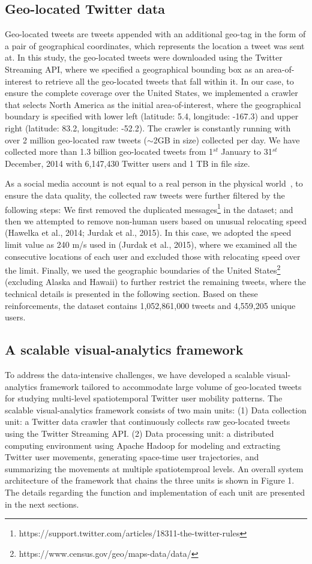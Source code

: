 \documentclass[a4paper, 11pt]{article}
\begin{document}
\subsection{Geo-located Twitter data}
Geo-located tweets are tweets appended with an additional geo-tag in the form of a pair of geographical coordinates, which represents the location a tweet was sent at. In this study, the geo-located tweets were downloaded using the Twitter Streaming API, where we specified a geographical bounding box as an area-of-interest to retrieve all the geo-located tweets that fall within it. 
In our case, to ensure the complete coverage over the United States, we implemented a crawler that selects North America as the initial area-of-interest, where the geographical boundary is specified with lower left (latitude: 5.4, longitude: -167.3) and upper right (latitude: 83.2, longitude: -52.2).
The crawler is constantly running with over 2 million geo-located raw tweets ($\sim$2GB in size) collected per day.
We have collected more than 1.3 billion geo-located tweets from 1$^{st}$ January to 31$^{st}$ December, 2014 with 6,147,430 Twitter users and 1 TB in file size.

As a social media account is not equal to a real person in the physical world~\citep{tsou2015}, to ensure the data quality, the collected raw tweets were further filtered by the following steps: We first removed the duplicated messages\footnote{https://support.twitter.com/articles/18311-the-twitter-rules} in the dataset; and then we attempted to remove non-human users based on unusual relocating speed (Hawelka et al., 2014; Jurdak et al., 2015). 
In this case, we adopted the speed limit value as 240 m/s used in (Jurdak et al., 2015), where we examined all the consecutive locations of each user and excluded those with relocating speed over the limit. 
Finally, we used the geographic boundaries of the United States\footnote{https://www.census.gov/geo/maps-data/data/} (excluding Alaska and Hawaii) to further restrict the remaining tweets, where the technical details is presented in the following section. Based on these reinforcements, the dataset contains 1,052,861,000 tweets and 4,559,205 unique users.

\subsection{A scalable visual-analytics framework}
To address the data-intensive challenges, we have developed a scalable visual-analytics framework tailored to accommodate large volume of geo-located tweets for studying multi-level spatiotemporal Twitter user mobility patterns.
The scalable visual-analytics framework consists of two main units: (1) Data collection unit: a Twitter data crawler that continuously collects raw geo-located tweets using the Twitter Streaming API. (2) Data processing unit: a distributed computing environment using Apache Hadoop for modeling and extracting Twitter user movements, generating space-time user trajectories, and summarizing the movements at multiple spatiotemproal levels.
An overall system architecture of the framework that chains the three units is shown in Figure 1. The details regarding the function and implementation of each unit are presented in the next sections.
\end{document}
